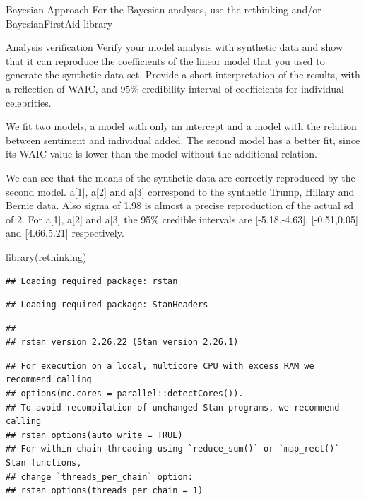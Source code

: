 \documentclass[
  ignorenonframetext,
]{beamer}
\newenvironment{Shaded}{\begin{snugshade}}{\end{snugshade}}
\newcommand{\FunctionTok}[1]{\textcolor[rgb]{0.00,0.00,0.00}{#1}}
\newcommand{\NormalTok}[1]{#1}
\begin{document}
\begin{frame}[fragile]{Bayesian Approach}
\protect\hypertarget{bayesian-approach}{}
For the Bayesian analyses, use the rethinking and/or BayesianFirstAid
library

\begin{block}{Analysis verification}
\protect\hypertarget{analysis-verification-1}{}
Verify your model analysis with synthetic data and show that it can
reproduce the coefficients of the linear model that you used to generate
the synthetic data set. Provide a short interpretation of the results,
with a reflection of WAIC, and 95\% credibility interval of coefficients
for individual celebrities.

We fit two models, a model with only an intercept and a model with the
relation between sentiment and individual added. The second model has a
better fit, since its WAIC value is lower than the model without the
additional relation.

We can see that the means of the synthetic data are correctly reproduced
by the second model. a{[}1{]}, a{[}2{]} and a{[}3{]} correspond to the
synthetic Trump, Hillary and Bernie data. Also sigma of 1.98 is almost a
precise reproduction of the actual sd of 2. For a{[}1{]}, a{[}2{]} and
a{[}3{]} the 95\% credible intervals are {[}-5.18,-4.63{]},
{[}-0.51,0.05{]} and {[}4.66,5.21{]} respectively.

\begin{Shaded}
\begin{Highlighting}[]
\FunctionTok{library}\NormalTok{(rethinking)}
\end{Highlighting}
\end{Shaded}

\begin{verbatim}
## Loading required package: rstan
\end{verbatim}

\begin{verbatim}
## Loading required package: StanHeaders
\end{verbatim}

\begin{verbatim}
## 
## rstan version 2.26.22 (Stan version 2.26.1)
\end{verbatim}

\begin{verbatim}
## For execution on a local, multicore CPU with excess RAM we recommend calling
## options(mc.cores = parallel::detectCores()).
## To avoid recompilation of unchanged Stan programs, we recommend calling
## rstan_options(auto_write = TRUE)
## For within-chain threading using `reduce_sum()` or `map_rect()` Stan functions,
## change `threads_per_chain` option:
## rstan_options(threads_per_chain = 1)
\end{verbatim}


\end{block}
\end{frame}
\end{document}
